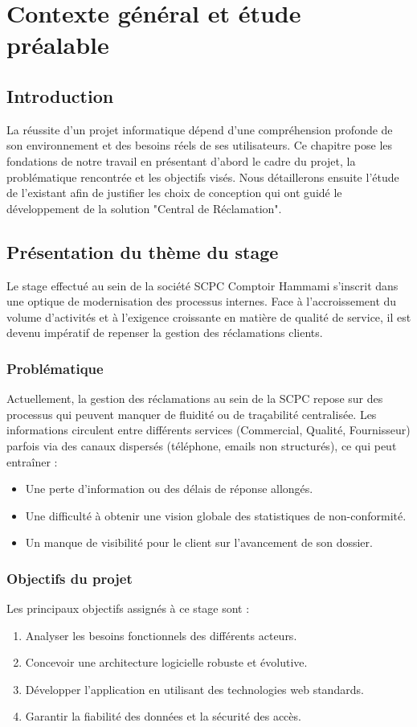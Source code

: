 \chapter{Contexte général et étude préalable}

\section*{Introduction}
La réussite d'un projet informatique dépend d'une compréhension profonde de son environnement et des besoins réels de ses utilisateurs. Ce chapitre pose les fondations de notre travail en présentant d'abord le cadre du projet, la problématique rencontrée et les objectifs visés. Nous détaillerons ensuite l'étude de l'existant afin de justifier les choix de conception qui ont guidé le développement de la solution "Central de Réclamation".

\section{Présentation du thème du stage}
Le stage effectué au sein de la société SCPC Comptoir Hammami s'inscrit dans une optique de modernisation des processus internes. Face à l'accroissement du volume d'activités et à l'exigence croissante en matière de qualité de service, il est devenu impératif de repenser la gestion des réclamations clients.

\subsection{Problématique}
Actuellement, la gestion des réclamations au sein de la SCPC repose sur des processus qui peuvent manquer de fluidité ou de traçabilité centralisée. Les informations circulent entre différents services (Commercial, Qualité, Fournisseur) parfois via des canaux dispersés (téléphone, emails non structurés), ce qui peut entraîner :
\begin{itemize}
    \item Une perte d'information ou des délais de réponse allongés.
    \item Une difficulté à obtenir une vision globale des statistiques de non-conformité.
    \item Un manque de visibilité pour le client sur l'avancement de son dossier.
\end{itemize}

\subsection{Objectifs du projet}
Les principaux objectifs assignés à ce stage sont :
\begin{enumerate}
    \item Analyser les besoins fonctionnels des différents acteurs.
    \item Concevoir une architecture logicielle robuste et évolutive.
    \item Développer l'application en utilisant des technologies web standards.
    \item Garantir la fiabilité des données et la sécurité des accès.
\end{enumerate}


